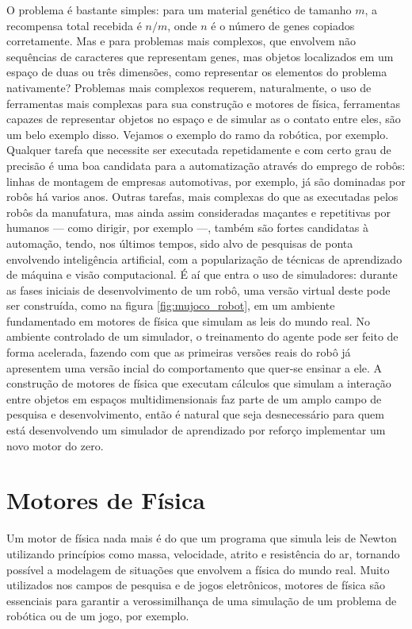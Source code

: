 \documentclass[cic,tc]{iiufrgs}
\begin{document}
O problema é bastante simples: para um material genético de tamanho $m$, a
recompensa total recebida é $n/m$, onde $n$ é o número de genes copiados
corretamente. Mas e para problemas mais complexos, que envolvem não sequências
de caracteres que representam genes, mas objetos localizados em um espaço de
duas ou três dimensões, como representar os elementos do problema nativamente?
Problemas mais complexos requerem, naturalmente, o uso de ferramentas mais
complexas para sua construção e motores de física, ferramentas capazes de
representar objetos no espaço e de simular as o contato entre eles, são um belo
exemplo disso.
Vejamos o exemplo do ramo da robótica, por exemplo. Qualquer tarefa que necessite
ser executada repetidamente e com certo grau de precisão é uma boa candidata
para a automatização através do emprego de robôs: linhas de montagem de
empresas automotivas, por exemplo, já são dominadas por robôs há varios anos.
Outras tarefas, mais complexas do que as executadas pelos robôs da manufatura,
mas ainda assim consideradas maçantes e repetitivas por humanos --- como
dirigir, por exemplo ---, também são fortes candidatas à automação, tendo, nos
últimos tempos, sido alvo de pesquisas de ponta envolvendo inteligência
artificial, com a popularização de técnicas de aprendizado de máquina e visão
computacional. É aí que entra o uso de simuladores: durante as fases iniciais
de desenvolvimento de um robô, uma versão virtual deste pode ser construída,
como na figura \ref{fig:mujoco_robot}, em um ambiente fundamentado em motores
de física que simulam as leis do mundo real. No ambiente controlado de um
simulador, o treinamento do agente pode ser feito de forma acelerada, fazendo
com que as primeiras versões reais do robô já apresentem uma versão incial do
comportamento que quer-se ensinar a ele.
A construção de motores de física que executam cálculos que simulam a interação
entre objetos em espaços multidimensionais faz parte de um amplo campo de
pesquisa e desenvolvimento, então é natural que seja desnecessário para quem
está desenvolvendo um simulador de aprendizado por reforço implementar um novo
motor do zero.


\section{Motores de Física}
Um motor de física nada mais é do que um programa que simula leis de Newton
utilizando princípios como massa, velocidade, atrito e resistência do ar,
tornando possível a modelagem de situações que envolvem a física do mundo real.
Muito utilizados nos campos de pesquisa e de jogos eletrônicos, motores de
física são essenciais para garantir a verossimilhança de uma simulação de um
problema de robótica ou de um jogo, por exemplo.
\end{document}
